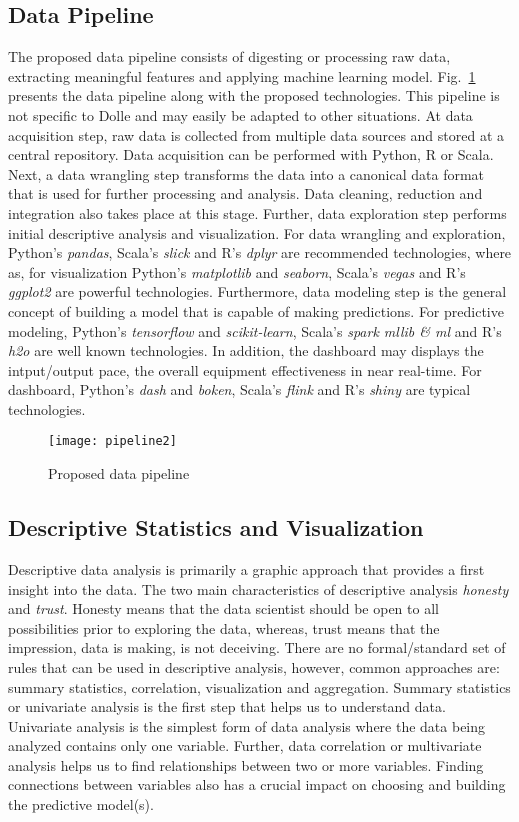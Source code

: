 \documentclass[runningheads]{llncs}
\begin{document}
\subsection{Data Pipeline}
\label{sec:datapipeline}
The proposed data pipeline consists of digesting or processing raw data, extracting meaningful features and applying machine learning model. Fig.~\ref{fig:pipeline1} presents the data pipeline along with the proposed technologies. This pipeline is not specific to Dolle and may easily be adapted to other situations. At data acquisition step, raw data is collected from multiple data sources and stored at a central repository. Data acquisition can be performed with Python, R or Scala. Next, a data wrangling step transforms the data into a canonical data format that is used for further processing and analysis. Data cleaning, reduction and integration also takes place at this stage. Further, data exploration step performs initial descriptive analysis and visualization. For data wrangling and exploration, Python's \emph{pandas}, Scala's \emph{slick} and R's \emph{dplyr} are recommended technologies, where as, for visualization Python's \emph{matplotlib} and \emph{seaborn}, Scala's \emph{vegas} and R's \emph{ggplot2} are powerful technologies. Furthermore, data modeling step is the general concept of building a model that is capable of making predictions. For predictive modeling, Python's \emph{tensorflow} and \emph{scikit-learn}, Scala's \emph{spark mllib \& ml} and R's \emph{h2o} are well known technologies. In addition, the dashboard may displays the intput/output pace, the overall equipment effectiveness in near real-time. For dashboard, Python's \emph{dash} and \emph{boken}, Scala's \emph{flink} and R's \emph{shiny} are typical technologies.

\begin{figure}
\centering
\texttt{[image: pipeline2]} 
\caption{Proposed data pipeline}
\label{fig:pipeline1}
\end{figure}

\fi

\subsection{Descriptive Statistics and Visualization }
\label{sec:dataanalysis}
Descriptive data analysis is primarily a graphic approach that provides a first insight into the data. The two main characteristics of descriptive analysis \emph{honesty} and \emph{trust}. Honesty means that the data scientist should be open to all possibilities prior to exploring the data, whereas, trust means that the impression, data is making, is not deceiving. There are no formal/standard set of rules that can be used in descriptive analysis, however, common approaches are: summary statistics, correlation, visualization and aggregation. Summary statistics or univariate analysis is the first step that helps us to understand data. Univariate analysis is the simplest form of data analysis where the data being analyzed contains only one variable. Further, data correlation or multivariate analysis helps us to find relationships between two or more variables. Finding connections between variables also has a crucial impact on choosing and building the predictive model(s). 
\end{document}
